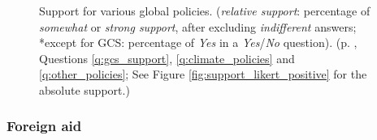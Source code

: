 \begin{bibunit}
\begin{figure}
  \caption[Relative support for other global policies]{Support for various global policies. (\textit{relative support}: percentage of \textit{somewhat} or \textit{strong support}, after excluding \textit{indifferent} answers; *except for GCS: percentage of \textit{Yes} in a \textit{Yes}/\textit{No} question). (p. \pageref{subsec:questionnaire_GCS}, Questions \ref{q:gcs_support}, \ref{q:climate_policies} and \ref{q:other_policies}; See Figure \ref{fig:support_likert_positive} for the absolute support.)%
  }
  \label{fig:support}
\end{figure} 

\subsubsection{Foreign aid}\label{subsubsec:support_foreign_aid} %


\end{bibunit}
